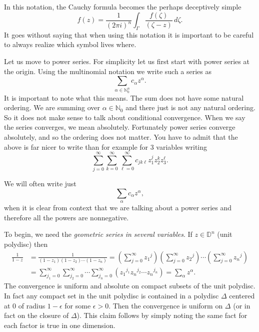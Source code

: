 \documentclass[12pt,openany]{book}
\newcommand{\N}{{\mathbb{N}}}
\newcommand{\D}{{\mathbb{D}}}
\newcommand{\myindex}[1]{#1\index{#1}}
\theoremstyle{plain}
\theoremstyle{remark}
\theoremstyle{definition}
\theoremstyle{exercise}
\theoremstyle{example}
\begin{document}
In this notation, the Cauchy formula becomes the perhaps deceptively simple
\begin{equation*}
f(z) =
\frac{1}{{(2\pi i)}^n}
\int_{\Gamma}
\frac{f(\zeta)}{(\zeta-z)}
\,
d \zeta .
\end{equation*}
It goes without saying that when using this notation it is
important to be careful to always realize which symbol lives where.

Let us move to power series.  For simplicity let us first start with
power series at the origin.  Using the multinomial notation we write
such a series as
\begin{equation*}
\sum_{\alpha \in \N_0^n} c_\alpha {z}^\alpha .
\end{equation*}
It is important to note what this means.  The sum does not
have some natural ordering.  We are summing over $\alpha \in \N_0$ and there
just is not any natural ordering.  So it does not make sense to
talk about conditional convergence.  When we say the series
converges, we mean absolutely.
Fortunately power series converge
absolutely, and so the ordering does not matter.  You have to admit that the
above is far nicer to write than for example for 3 variables writing
\begin{equation*}
\sum_{j=0}^\infty
\sum_{k=0}^\infty
\sum_{\ell=0}^\infty
c_{jk\ell} z_1^jz_2^kz_3^\ell .
\end{equation*}

We will often write just
\begin{equation*}
\sum_{\alpha} c_\alpha {z}^\alpha ,
\end{equation*}
when it is clear from context that we are talking about a power series
and therefore all the powers are nonnegative.

To begin, we need the \emph{\myindex{geometric series in several variables}}.
If 
$z \in \D^n$ (unit polydisc) then
\begin{equation*}
\begin{split}
\frac{1}{1-z} & =
\frac{1}{(1-z_1)(1-z_2)\cdots(1-z_n)} =
\left(
\sum_{j=0}^\infty {z_1}^j
\right)
\left(
\sum_{j=0}^\infty {z_2}^j
\right)
\cdots
\left(
\sum_{j=0}^\infty {z_n}^j
\right)
\\
& = 
\sum_{j_1=0}^\infty
\sum_{j_2=0}^\infty
\cdots
\sum_{j_n=0}^\infty
\left(
{z_1}^{j_1}
{z_n}^{j_2}
\cdots
{z_n}^{j_n}
\right)
=
\sum_{\alpha} z^\alpha .
\end{split}
\end{equation*}
The convergence is uniform and absolute on compact subsets of the unit
polydisc.  In fact any compact set in the unit
polydisc is contained in a polydisc $\Delta$ centered at 0 of radius $1-\epsilon$
for some $\epsilon > 0$.  Then the convergence is uniform on $\Delta$ (or in
fact on the closure of $\Delta$).  This claim follows by simply noting the
same fact for each factor is true in one dimension.
\end{document}
